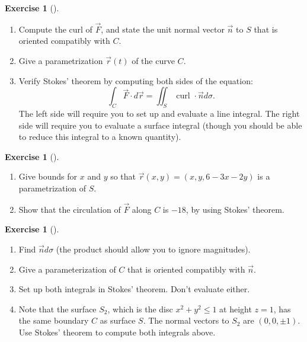 \documentclass[10pt,]{book}
\theoremstyle{plain}
\theoremstyle{definition}
\theoremstyle{definition}
\theoremstyle{definition}
\theoremstyle{definition}
\newtheorem{exploration}[project]{Exercise}
\theoremstyle{definition}
\numberwithin{equation}{section}
\begin{document}
\begin{exploration}[]\label{exploration-292}
\leavevmode%
\begin{enumerate}[font=\bfseries,label=(\alph*),ref=\alph*]
\item\label{task-794} Compute the curl of \(\vec F\), and state the unit normal vector \(\vec n\) to \(S\) that is oriented compatibly with \(C\).%
\item\label{task-795} Give a parametrization \(\vec r(t)\) of the curve \(C\).%
\item\label{task-796} Verify Stokes' theorem by computing both sides of the equation:%
\begin{equation*}
\int_C\vec F\cdot d\vec r = \iint_S \text{ curl } \cdot \vec n d\sigma.
\end{equation*}
The left side will require you to set up and evaluate a line integral.  The right side will require you to evaluate a surface integral (though you should be able to reduce this integral to a known quantity).%
\end{enumerate}
\end{exploration}
\begin{exploration}[]\label{exploration-293}
\leavevmode%
\begin{enumerate}[font=\bfseries,label=(\alph*),ref=\alph*]
\item\label{task-797} Give bounds for \(x\) and \(y\) so that \(\vec r(x,y)=(x,y,6-3x-2y)\) is a parametrization of \(S\).%
\item\label{task-798} Show that the circulation of \(\vec F\) along \(C\) is \(-18\), by using Stokes' theorem.%
\end{enumerate}
\end{exploration}
\begin{exploration}[]\label{exploration-294}
\leavevmode%
\begin{enumerate}[font=\bfseries,label=(\alph*),ref=\alph*]
\item\label{task-799} Find \(\vec n d\sigma\) (the product should allow you to ignore magnitudes).%
\item\label{task-800} Give a parameterization of \(C\) that is oriented compatibly with \(\vec n\).%
\item\label{task-801} Set up both integrals in Stokes' theorem. Don't evaluate either.%
\item\label{task-802} Note that the surface \(S_2\), which is the disc \(x^2+y^2\leq 1\) at height \(z=1\), has the same boundary \(C\) as surface \(S\). The normal vectors to \(S_2\) are \((0,0,\pm 1)\). Use Stokes' theorem to compute both integrals above.%
\end{enumerate}
\end{exploration}
\end{document}
